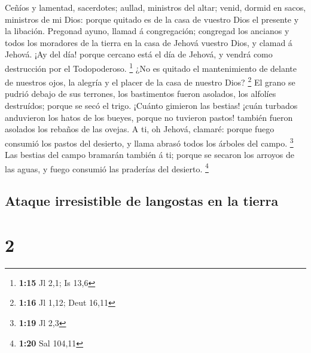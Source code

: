  Ceñíos y lamentad, sacerdotes; aullad, ministros del
altar; venid, dormid en sacos, ministros de mi Dios: porque quitado es
de la casa de vuestro Dios el presente y la libación. 
Pregonad ayuno, llamad á congregación; congregad los ancianos y todos
los moradores de la tierra en la casa de Jehová vuestro Dios, y clamad á
Jehová.  ¡Ay del día! porque cercano está el día de Jehová,
y vendrá como destrucción por el Todopoderoso. \footnote{\textbf{1:15}
  Jl 2,1; Is 13,6}  ¿No es quitado el mantenimiento de
delante de nuestros ojos, la alegría y el placer de la casa de nuestro
Dios? \footnote{\textbf{1:16} Jl 1,12; Deut 16,11}  El
grano se pudrió debajo de sus terrones, los bastimentos fueron asolados,
los alfolíes destruídos; porque se secó el trigo.  ¡Cuánto
gimieron las bestias! ¡cuán turbados anduvieron los hatos de los bueyes,
porque no tuvieron pastos! también fueron asolados los rebaños de las
ovejas.  A ti, oh Jehová, clamaré: porque fuego consumió
los pastos del desierto, y llama abrasó todos los árboles del campo.
\footnote{\textbf{1:19} Jl 2,3}  Las bestias del campo
bramarán también á ti; porque se secaron los arroyos de las aguas, y
fuego consumió las praderías del desierto. \footnote{\textbf{1:20} Sal
  104,11}

\hypertarget{ataque-irresistible-de-langostas-en-la-tierra}{%
\subsection{Ataque irresistible de langostas en la
tierra}\label{ataque-irresistible-de-langostas-en-la-tierra}}

\hypertarget{section-1}{%
\section{2}\label{section-1}}


